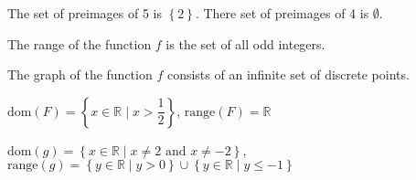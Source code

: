 \vskip9pt
\begin{list}{\bf{\ref{exer:sec61-5}.}}
\item \begin{list}{\bf{(b)}}
\item The set of preimages of  5 is  $\left\{ 2 \right\}$.  There set of preimages of 4 is 
$\emptyset$.
\end{list}
\end{list}
%
\begin{list}{}
\item \begin{list}{\bf{(c)}}
\item The range of the function  $f$  is the set of all odd integers.
\end{list}
\end{list}
%
\begin{list}{}
\item \begin{list}{\bf{(d)}}
\item The graph of the function  $f$  consists of an infinite set of discrete points.
\end{list}
\end{list}


\begin{list}{\bf{\ref{exer:sec61-9}.}}
\item \begin{list}{\bf{(b)}}
\item $\text{dom} ( F ) = \left\{ {x \in \mathbb{R} \mid x > \dfrac{1}{2}} \right\}$,  
$\text{range} ( F ) = \mathbb{R}$

\end{list}
\end{list}


\begin{list}{}
\item \begin{list}{\bf{(d)}}
\item $\text{dom} ( g ) = \left\{ {x \in \mathbb{R} \mid x \ne 2\text{  and  }x \ne  - 2} \right\}$, \\
$\text{range} ( g ) = \left\{ { {y \in \mathbb{R} } \mid y > 0} \right\} \cup 
\left\{ {y \in \mathbb{R} \mid y \leq  - 1} \right\}$
\end{list}
\end{list}




